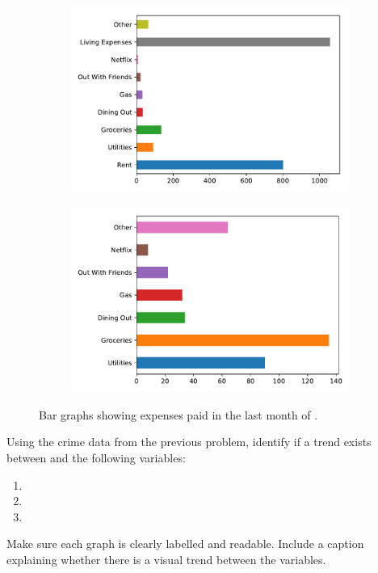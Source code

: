 \begin{figure}[H] %
\captionsetup[subfigure]{justification=centering}
\centering
\begin{subfigure}{.49\textwidth}
    \includegraphics[width=\textwidth]{figures/all_expenses.pdf}
\end{subfigure}
%
\begin{subfigure}{.49\textwidth}
    \includegraphics[width=\textwidth]{figures/some_expenses.pdf}
\end{subfigure}
\caption{Bar graphs showing expenses paid in the last month of .}
\end{figure}

\begin{problem}
Using the crime data from the previous problem, identify if a trend exists between  and the following variables:
\begin{enumerate}
\item {}
\item {}
\item {}
\end{enumerate}

Make sure each graph is clearly labelled and readable.
Include a caption explaining whether there is a visual trend between the variables.
\end{problem}


